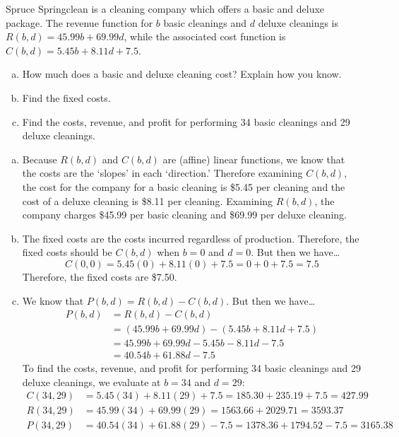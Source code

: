 \documentclass[11pt,letterpaper]{article}
\begin{document}
 Spruce Springclean is a cleaning company which offers a basic and deluxe package. The revenue function for $b$ basic cleanings and $d$ deluxe cleanings is $R(b, d)= 45.99b + 69.99d$, while the associated cost function is $C(b, d)= 5.45b + 8.11d + 7.5$. 
	\begin{enumerate}[(a)]
	\item How much does a basic and deluxe cleaning cost? Explain how you know. 
	\item Find the fixed costs.
	\item Find the costs, revenue, and profit for performing 34 basic cleanings and 29 deluxe cleanings. 
	\end{enumerate} \pspace

\sol
\begin{enumerate}[(a)]
\item Because $R(b, d)$ and $C(b, d)$ are (affine) linear functions, we know that the costs are the `slopes' in each `direction.' Therefore examining $C(b, d)$, the cost for the company for a basic cleaning is \$5.45 per cleaning and the cost of a deluxe cleaning is \$8.11 per cleaning. Examining $R(b, d)$, the company charges \$45.99 per basic cleaning and \$69.99 per deluxe cleaning. \pspace

\item The fixed costs are the costs incurred regardless of production. Therefore, the fixed costs should be $C(b, d)$ when $b= 0$ and $d= 0$. But then we have\dots
	\[
	C(0, 0)= 5.45(0) + 8.11(0) + 7.5= 0 + 0 + 7.5= 7.5
	\]
Therefore, the fixed costs are \$7.50. \pspace

\item We know that $P(b, d)= R(b, d) - C(b, d)$. But then we have\dots
	\[
	\begin{aligned}
	P(b, d)&= R(b, d) - C(b, d) \\
	&= (45.99b + 69.99d) - (5.45b + 8.11d + 7.5) \\
	&= 45.99b + 69.99d - 5.45b - 8.11d - 7.5 \\
	&= 40.54b + 61.88d - 7.5
	\end{aligned}
	\] 
To find the costs, revenue, and profit for performing 34 basic cleanings and 29 deluxe cleanings, we evaluate at $b= 34$ and $d= 29$:
	\[
	\begin{aligned}
	C(34, 29)&= 5.45(34) + 8.11(29) + 7.5= 185.30 + 235.19 + 7.5= 427.99 \\
	R(34, 29)&= 45.99(34) + 69.99(29)= 1563.66 + 2029.71= 3593.37 \\
	P(34, 29)&= 40.54(34) + 61.88(29) - 7.5= 1378.36 + 1794.52 - 7.5= 3165.38
	\end{aligned}
	\] 
\end{enumerate}
\end{document}
